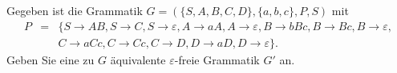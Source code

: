 
\begin{exercise}
Gegeben ist die Grammatik $G=(\{S,A,B,C,D\},\{a,b,c\},P,S)$ mit
\begin{eqnarray*}
  P & = & \{S\longrightarrow AB, S\longrightarrow C, S\longrightarrow \varepsilon, 
  A\longrightarrow aA,  A\longrightarrow \varepsilon, B\longrightarrow bBc,  B\longrightarrow Bc,  B\longrightarrow\varepsilon,\\
  & & C\longrightarrow aCc, C\longrightarrow Cc, C\longrightarrow D, D\longrightarrow aD, D\longrightarrow \varepsilon\}.
\end{eqnarray*}
Geben Sie eine zu $G$ äquivalente $\varepsilon$-freie Grammatik $G'$ an. 
\end{exercise}
